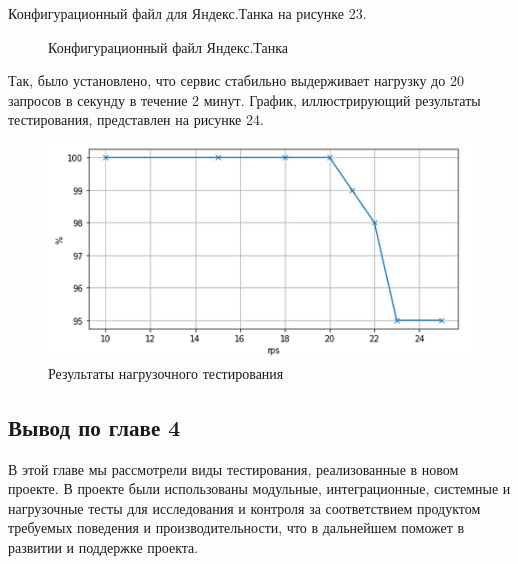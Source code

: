    Конфигурационный файл для Яндекс.Танка на рисунке 23.
    \begin{figure}[H]
        \centering
        
        \caption{Конфигурационный файл Яндекс.Танка}
        \label{fig:tank-load}
    \end{figure}

    Так, было установлено, что сервис стабильно выдерживает нагрузку до 20
    запросов в секунду в течение 2 минут.
    График, иллюстрирующий результаты тестирования, представлен на рисунке 24.
    \begin{figure}[H]
        \centering
        \includegraphics[width=0.7\linewidth]{static/tank-result.png}
        \caption{Результаты нагрузочного тестирования}
        \label{fig:tank-result}
    \end{figure}

    \subsection*{Вывод по главе 4}
    В этой главе мы рассмотрели виды тестирования, реализованные в новом проекте.
    В проекте были использованы модульные, интеграционные, системные и нагрузочные
    тесты для исследования и контроля за соответствием продуктом требуемых
    поведения и производительности,
    что в дальнейшем поможет в развитии и поддержке проекта.
